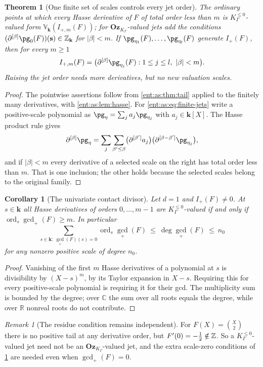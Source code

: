 \documentclass[11pt]{article}
\newtheorem{theorem}{Theorem}[section]
\theoremstyle{plain}
\theoremstyle{plain}
\theoremstyle{plain}
\newtheorem{corollary}[corollary]{Corollary}
\theoremstyle{definition}
\theoremstyle{definition}
\theoremstyle{definition}
\theoremstyle{definition}
\theoremstyle{remark}
\newtheorem{remark}[remark]{Remark}
\newcommand{\C}{\mathbb C}\newcommand{\R}{\mathbb R}
\newcommand{\K}{K_\Gamma}\newcommand{\KD}{K_\Delta}
\DeclareMathOperator{\ord}{ord}\DeclareMathOperator{\cf}{cf}
\newcommand{\kk}{\mathbf k}\newcommand{\PP}{\mathbb P}
\newcommand{\Oz}{\mathbf{Oz}}\newcommand{\Ed}{\mathcal E_{\Gamma,d}}
\newcommand{\Kle}{K_\Gamma^{\le0}}\DeclareMathOperator{\Jac}{Jac}
\newcommand{\Zk}{\Z_{\kk}}\newcommand{\OzK}{\Oz_{\K}}
\begin{document}
\begin{theorem}[One finite set of scales controls every jet order]
\label{ent:as:thm:jets}
The ordinary points at which every Hasse derivative of $F$ of total order less
than $m$ is $\Kle$-valued form $\mathbb V_\kk(I_{+,m}(F))$; for $\OzK$-valued
jets add the conditions $(\partial^{[\beta]}\pg_0(F))(\mathbf s)\in\Zk$ for
$|\beta|<m$. If $\pg_{\eta_1}(F),\ldots,\pg_{\eta_l}(F)$ generate $I_+(F)$, then
for \emph{every} $m\ge1$
\begin{equation}\label{ent:as:eq:finite-jets}
 I_{+,m}(F)=\bigl(\partial^{[\beta]}\pg_{\eta_j}(F):
 1\le j\le l,\ |\beta|<m\bigr).
\end{equation}
Raising the jet order needs more derivatives, but no new valuation scales.
\end{theorem}
\begin{proof}
The pointwise assertions follow from \cref{ent:as:thm:tail} applied to the
finitely many derivatives, with \cref{ent:as:lem:hasse}. For
\eqref{ent:as:eq:finite-jets} write a positive-scale polynomial as
$\pg_\eta=\sum_ja_j\pg_{\eta_j}$ with $a_j\in\kk[X]$. The Hasse product rule
gives
\[
 \partial^{[\beta]}\pg_\eta
 =\sum_j\sum_{\beta'\le\beta}
 \bigl(\partial^{[\beta']}a_j\bigr)\bigl(\partial^{[\beta-\beta']}\pg_{\eta_j}\bigr),
\]
and if $|\beta|<m$ every derivative of a selected scale on the right has total
order less than $m$. That is one inclusion; the other holds because the
selected scales belong to the original family.
\end{proof}

\begin{corollary}[The univariate contact divisor]\label{ent:as:cor:contact}
Let $d=1$ and $I_+(F)\ne0$. At $s\in\kk$ all Hasse derivatives of orders
$0,\ldots,m-1$ are $\Kle$-valued if and only if $\ord_s\gcd_+(F)\ge m$. In
particular
\[
 \sum_{s\in\kk:\ \gcd_+(F)(s)=0}\ord_s\gcd_+(F)\ \le\ \deg\gcd_+(F)\ \le\ n_0
\]
for any nonzero positive scale of degree $n_0$.
\end{corollary}
\begin{proof}
Vanishing of the first $m$ Hasse derivatives of a polynomial at $s$ is
divisibility by $(X-s)^m$, by its Taylor expansion in $X-s$. Requiring this
for every positive-scale polynomial is requiring it for their gcd. The
multiplicity sum is bounded by the degree; over $\C$ the sum over all roots
equals the degree, while over $\R$ nonreal roots do not contribute.
\end{proof}

\begin{remark}[The residue condition remains independent]
\label{ent:as:rem:residue}
For $F(X)=\binom X2$ there is no positive tail at any derivative order, but
$F'(0)=-\tfrac12\notin\mathbb Z$. So a $\Kle$-valued jet need not be an $\OzK$-valued
jet, and the extra scale-zero conditions of \cref{ent:as:thm:jets} are needed
even when $\gcd_+(F)=0$.
\end{remark}
\end{document}
